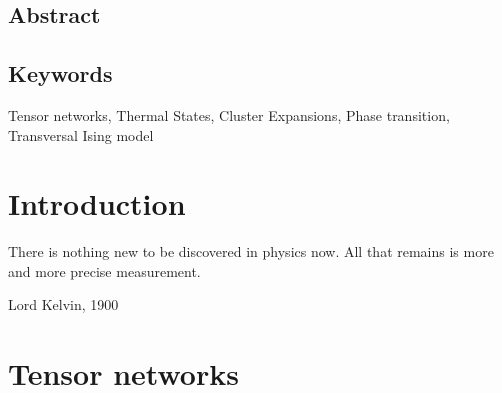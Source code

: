 \documentclass{book}
\newcounter{a}
\newcounter{b}
\begin{document}

\section*{Abstract}




\section*{Keywords}

Tensor networks, Thermal States, Cluster Expansions, Phase transition, Transversal Ising model

\newpage




\setcounter{tocdepth}{3}
\tableofcontents

\newpage


\printglossary[type=\acronymtype]




\mainmatter


\chapter{Introduction}\label{chap1}

\epigraph{There is nothing new to be discovered in physics now. All that remains is more and more precise measurement.}{Lord Kelvin, 1900}



\chapter{Tensor networks}\label{chap2}
\end{document}
